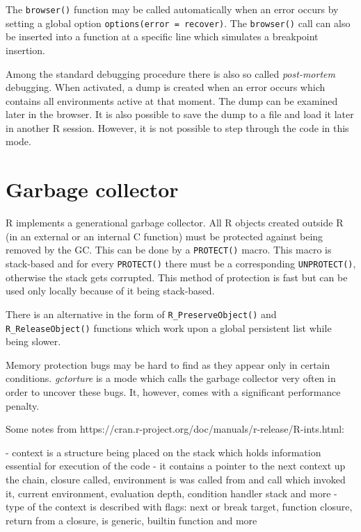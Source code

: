 \documentclass[thesis=M,english,hidelinks]{FITthesis}[2012/10/20]
\begin{document}
	The \lstinline|browser()| function may be called automatically when an error occurs by setting a global option \lstinline|options(error = recover)|. The \lstinline|browser()| call can also be inserted into a function at a specific line which simulates a breakpoint insertion.\par
	
	Among the standard debugging procedure there is also so called \emph{post-mortem} debugging. When activated, a dump is created when an error occurs which contains all environments active at that moment. The dump can be examined later in the browser. It is also possible to save the dump to a file and load it later in another R session. However, it is not possible to step through the code in this mode.\par
	
	\section{Garbage collector}
	R implements a generational garbage collector. All R objects created outside R (in an external or an internal C function) must be protected against being removed by the GC. This can be done by a \lstinline|PROTECT()| macro. This macro is stack-based and for every \lstinline|PROTECT()| there must be a corresponding \lstinline|UNPROTECT()|, otherwise the stack gets corrupted. This method of protection is fast but can be used only locally because of it being stack-based.\par
	
	There is an alternative in the form of \lstinline|R_PreserveObject()| and \lstinline|R_Release|\allowbreak\lstinline|Object()| functions which work upon a global persistent list while being slower.\par
	
	Memory protection bugs may be hard to find as they appear only in certain conditions. \emph{gctorture} is a mode which calls the garbage collector very often in order to uncover these bugs. It, however, comes with a significant performance penalty.\par

\iffalse
Some notes from https://cran.r-project.org/doc/manuals/r-release/R-ints.html:

- context is a structure being placed on the stack which holds information essential for execution of the code
- it contains a pointer to the next context up the chain, closure called, environment is was called from and call which invoked it, current environment, evaluation depth, condition handler stack and more
- type of the context is described with flags: next or break target, function closure, return from a closure, is generic, builtin function and more
\end{document}
